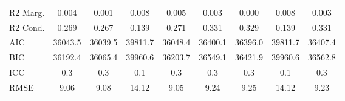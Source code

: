 \documentclass[]{report}
\begin{document}
\begin{table}
{\begin{tabular}[t]{lcccccccc}
		R2 Marg. & \num{0.004} & \num{0.001} & \num{0.008} & \num{0.005} & \num{0.003} & \num{0.000} & \num{0.008} & \num{0.003}\\
		R2 Cond. & \num{0.269} & \num{0.267} & \num{0.139} & \num{0.271} & \num{0.331} & \num{0.329} & \num{0.139} & \num{0.331}\\
		AIC & \num{36043.5} & \num{36039.5} & \num{39811.7} & \num{36048.4} & \num{36400.1} & \num{36396.0} & \num{39811.7} & \num{36407.4}\\
		BIC & \num{36192.4} & \num{36065.4} & \num{39960.6} & \num{36203.7} & \num{36549.1} & \num{36421.9} & \num{39960.6} & \num{36562.8}\\
		ICC & \num{0.3} & \num{0.3} & \num{0.1} & \num{0.3} & \num{0.3} & \num{0.3} & \num{0.1} & \num{0.3}\\
		RMSE & \num{9.06} & \num{9.08} & \num{14.12} & \num{9.05} & \num{9.24} & \num{9.25} & \num{14.12} & \num{9.23}\\
		\bottomrule
	\end{tabular}}
\end{table}
\end{document}
